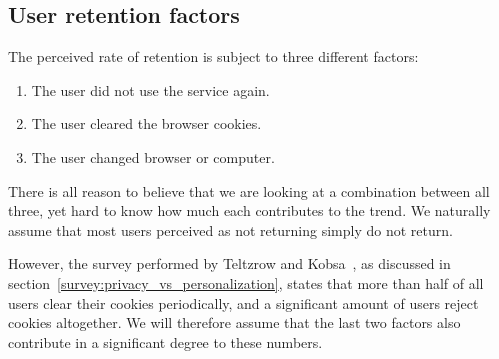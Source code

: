 \subsection{User retention factors}
\label{eval:retention_factors}

The perceived rate of retention is subject to three different factors:

\begin{enumerate}
  \item The user did not use the service again.
  \item The user cleared the browser cookies.
  \item The user changed browser or computer.
\end{enumerate}

There is all reason to believe that we are looking at a combination between all three, yet hard to know how much each contributes to the trend. We naturally assume that most users perceived as not returning simply do not return.

However, the survey performed by Teltzrow and Kobsa~\cite{Teltzrow2004}, as discussed in section~\ref{survey:privacy_vs_personalization}, states that more than half of all users clear their cookies periodically, and a significant amount of users reject cookies altogether. We will therefore assume that the last two factors also contribute in a significant degree to these numbers.

